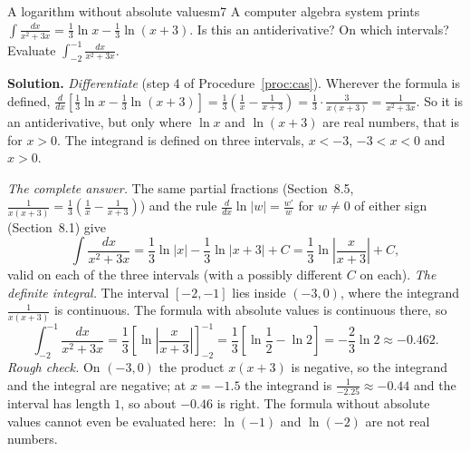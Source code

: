 \documentclass[11pt]{article}
\begin{document}
\begin{exmp}{A logarithm without absolute values}{m7}
A computer algebra system prints $\displaystyle\int\frac{dx}{x^2+3x}=\frac13\ln x-\frac13\ln(x+3)$. Is this an antiderivative? On which intervals? Evaluate $\displaystyle\int_{-2}^{-1}\frac{dx}{x^2+3x}$.

\textbf{Solution.} \emph{Differentiate} (step 4 of Procedure~\ref{proc:cas}). Wherever the formula is defined, $\frac d{dx}\left[\frac13\ln x-\frac13\ln(x+3)\right]=\frac13\left(\frac1x-\frac1{x+3}\right)=\frac13\cdot\frac{3}{x(x+3)}=\frac1{x^2+3x}$. So it is an antiderivative, but only where $\ln x$ and $\ln(x+3)$ are real numbers, that is for $x>0$. The integrand is defined on three intervals, $x<-3$, $-3<x<0$ and $x>0$.

\emph{The complete answer.} The same partial fractions (Section~8.5, $\frac1{x(x+3)}=\frac13\left(\frac1x-\frac1{x+3}\right)$) and the rule $\frac d{dx}\ln\lvert w\rvert=\frac{w'}w$ for $w\ne0$ of either sign (Section~8.1) give
\[\int\frac{dx}{x^2+3x}=\frac13\ln\lvert x\rvert-\frac13\ln\lvert x+3\rvert+C=\frac13\ln\left\lvert\frac x{x+3}\right\rvert+C,\]
valid on each of the three intervals (with a possibly different $C$ on each).
\emph{The definite integral.} The interval $[-2,-1]$ lies inside $(-3,0)$, where the integrand $\frac1{x(x+3)}$ is continuous. The formula with absolute values is continuous there, so
\[\int_{-2}^{-1}\frac{dx}{x^2+3x}=\frac13\left[\ln\left\lvert\frac x{x+3}\right\rvert\right]_{-2}^{-1}=\frac13\left[\ln\frac12-\ln2\right]=-\frac23\ln2\approx-0.462 .\]
\emph{Rough check.} On $(-3,0)$ the product $x(x+3)$ is negative, so the integrand and the integral are negative; at $x=-1.5$ the integrand is $\frac1{-2.25}\approx-0.44$ and the interval has length $1$, so about $-0.46$ is right. The formula without absolute values cannot even be evaluated here: $\ln(-1)$ and $\ln(-2)$ are not real numbers.
\end{exmp}
\end{document}
